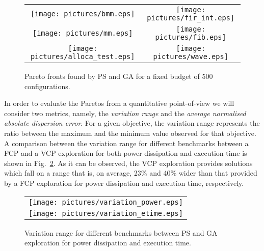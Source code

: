 \begin{itemize}
\begin{figure}
  \centering
  \begin{tabular}{cc}
    \texttt{[image: pictures/bmm.eps]} & \texttt{[image: pictures/fir\_int.eps]} \\
    \texttt{[image: pictures/mm.eps]} & \texttt{[image: pictures/fib.eps]} \\
    \texttt{[image: pictures/alloca\_test.eps]} & \texttt{[image: pictures/wave.eps]}
  \end{tabular}
  \caption{Pareto fronts found by PS and GA for a fixed budget of 500 configurations.}
  \label{fig:pareto_fronts}
\end{figure}

In order to evaluate the Paretos from a quantitative point-of-view we
will consider two metrics, namely, the \emph{variation range} and the
\emph{average normalised absolute dispersion error}. For a given
objective, the variation range represents the ratio between the
maximum and the minimum value observed for that objective. A
comparison between the variation range for different benchmarks
between a FCP and a VCP exploration for both power dissipation and
execution time is shown in Fig.~\ref{fig:variation_range}. As it can
be observed, the VCP exploration provides solutions which fall on a
range that is, on average, 23\% and 40\% wider than that provided by a
FCP exploration for power dissipation and execution time,
respectively.
\begin{figure}
  \centering
  \begin{tabular}{c}
    \texttt{[image: pictures/variation\_power.eps]} \\
    \texttt{[image: pictures/variation\_etime.eps]}
  \end{tabular}
  \caption{Variation range for different benchmarks between PS and GA
  exploration for power dissipation and execution time.}
  \label{fig:variation_range}
\end{figure}



\end{itemize}
